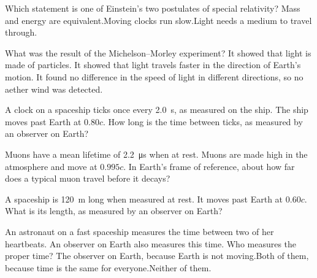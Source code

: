 
\begin{quizq}{}
Which statement is one of Einstein's two postulates of special relativity?
  {Mass and energy are equivalent.}{Moving clocks run slow.}{Light needs a medium to travel through.}
\end{quizq}

\begin{quizq}{}
What was the result of the Michelson--Morley experiment?
  {It showed that light is made of particles.}
  {It showed that light travels faster in the direction of Earth's motion.}
  {It found no difference in the speed of light in different directions, so no aether wind was
   detected.}
\end{quizq}

\begin{quizq}{}
A clock on a spaceship ticks once every \qty{2.0}{s}, as measured on the ship. The ship moves past Earth
at $0.80c$. How long is the time between ticks, as measured by an observer on Earth?
\end{quizq}

\begin{quizq}{}
Muons have a mean lifetime of \qty{2.2}{\micro s} when at rest. Muons are made high in the atmosphere and
move at $0.995c$. In Earth's frame of reference, about how far does a typical muon travel before it
decays?
\end{quizq}

\begin{quizq}{}
A spaceship is \qty{120}{m} long when measured at rest. It moves past Earth at $0.60c$. What is its
length, as measured by an observer on Earth?
\end{quizq}

\begin{quizq}{}
An astronaut on a fast spaceship measures the time between two of her heartbeats. An observer on
Earth also measures this time. Who measures the proper time?
  {The observer on Earth, because Earth is not moving.}{Both of them, because time is the same for
  everyone.}{Neither of them.}
\end{quizq}

